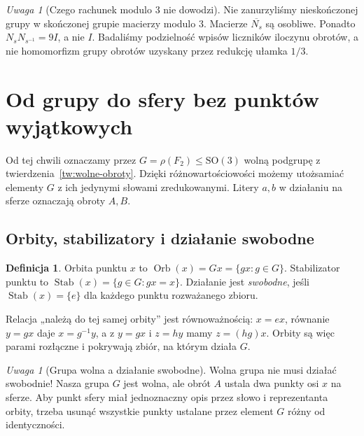 \documentclass[11pt,a4paper]{article}
\numberwithin{equation}{section}
\theoremstyle{plain}
\theoremstyle{definition}
\newtheorem{definicja}[twierdzenie]{Definicja}
\theoremstyle{remark}
\newtheorem{uwaga}[twierdzenie]{Uwaga}
\newcommand{\Orb}{\operatorname{Orb}}
\newcommand{\Stab}{\operatorname{Stab}}
\begin{document}
\begin{uwaga}[Czego rachunek modulo 3 nie dowodzi]
Nie zanurzyliśmy nieskończonej grupy w skończonej grupie macierzy modulo $3$. Macierze $\overline{N_s}$ są osobliwe. Ponadto $N_sN_{s^{-1}}=9I$, a nie $I$. Badaliśmy podzielność wpisów liczników iloczynu obrotów, a nie homomorfizm grupy obrotów uzyskany przez redukcję ułamka $1/3$.
\end{uwaga}

\section{Od grupy do sfery bez punktów wyjątkowych}
Od tej chwili oznaczamy przez $G=\rho(F_2)\le\mathrm{SO}(3)$ wolną podgrupę z twierdzenia~\ref{tw:wolne-obroty}. Dzięki różnowartościowości możemy utożsamiać elementy $G$ z ich jedynymi słowami zredukowanymi. Litery $a,b$ w działaniu na sferze oznaczają obroty $A,B$.

\subsection{Orbity, stabilizatory i działanie swobodne}
\begin{definicja}
Orbita punktu $x$ to $\Orb(x)=Gx=\{gx:g\in G\}$. Stabilizator punktu to $\Stab(x)=\{g\in G:gx=x\}$. Działanie jest \emph{swobodne}, jeśli $\Stab(x)=\{e\}$ dla każdego punktu rozważanego zbioru.
\end{definicja}
Relacja „należą do tej samej orbity” jest równoważnością: $x=ex$, równanie $y=gx$ daje $x=g^{-1}y$, a z $y=gx$ i $z=hy$ mamy $z=(hg)x$. Orbity są więc parami rozłączne i pokrywają zbiór, na którym działa $G$.
\begin{uwaga}[Grupa wolna a działanie swobodne]
Wolna grupa nie musi działać swobodnie! Nasza grupa $G$ jest wolna, ale obrót $A$ ustala dwa punkty osi $x$ na sferze. Aby punkt sfery miał jednoznaczny opis przez słowo i reprezentanta orbity, trzeba usunąć wszystkie punkty ustalane przez element $G$ różny od identyczności.
\end{uwaga}
\end{document}
